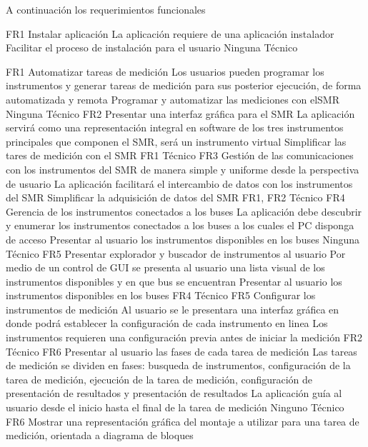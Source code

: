 \documentclass[paper=a4,oneside,fontsize=12pt]{article}
\newcommand{\SMR}{SMR\xspace}
\begin{document}
	A continuación los requerimientos funcionales
	
		{FR1}
			{Instalar aplicación}
			{La aplicación requiere de una aplicación instalador}
			{Facilitar el proceso de instalación para el usuario}
			{Ninguna}
			{Técnico}
		
		{FR1}
			{Automatizar tareas de medición}
			{Los usuarios pueden programar los instrumentos y generar tareas de medición para sus posterior ejecución, de forma automatizada y remota}
			{Programar y automatizar las mediciones con el\SMR}
			{Ninguna}
			{Técnico}
		{FR2}
			{Presentar una interfaz gráfica para el \SMR}
			{La aplicación servirá como una representación integral en software de los tres instrumentos principales que componen el \SMR, será un instrumento virtual}
			{Simplificar las tares de medición con el \SMR}
			{FR1}
			{Técnico}
		{FR3}
			{Gestión de las comunicaciones con los instrumentos del \SMR de manera simple y uniforme desde la perspectiva de usuario}
			{La aplicación facilitará el intercambio de datos con los instrumentos del \SMR}
			{Simplificar la adquisición de datos del \SMR}
			{FR1, FR2}
			{Técnico}				
		{FR4}
			{Gerencia de los instrumentos conectados a los buses}
			{La aplicación debe descubrir y enumerar los instrumentos conectados a los buses a los cuales el PC disponga de acceso}
			{Presentar al usuario los instrumentos disponibles en los buses}
			{Ninguna}
			{Técnico}
		{FR5}
			{Presentar explorador y buscador de instrumentos al usuario}
			{Por medio de un control de GUI se presenta al usuario una lista visual de los instrumentos disponibles y en que bus se encuentran}
			{Presentar al usuario los instrumentos disponibles en los buses}
			{FR4}
			{Técnico}
		{FR5}
			{Configurar los instrumentos de medición}
			{Al usuario se le presentara una interfaz gráfica en donde podrá establecer la configuración de cada instrumento en linea}
			{Los instrumentos requieren una configuración previa antes de iniciar la medición}
			{FR2}
			{Técnico}
		{FR6}
			{Presentar al usuario las fases de cada tarea de medición}
			{Las tareas de medición se dividen en fases: busqueda de instrumentos, configuración de la tarea de medición, ejecución de la tarea de medición, configuración de presentación de resultados y presentación de resultados}
			{La aplicación guía al usuario desde el inicio hasta el final de la tarea de medición}
			{Ninguno}
			{Técnico}
		{FR6}
			{Mostrar una representación gráfica del montaje a utilizar para una tarea de medición, orientada a diagrama de bloques}
\end{document}
